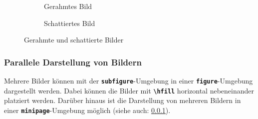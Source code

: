 \begin{figure}[H]
    \centering
    \begin{subfigure}{0.45\textwidth}
        \centering
        \caption{Gerahmtes Bild}
        \label{fig:gerahmtes_bild}
    \end{subfigure}
    \hfill
    \begin{subfigure}{0.45\textwidth}
        \centering
        \caption{Schattiertes Bild}
        \label{fig:schattiertes_bild}
    \end{subfigure}
    \caption{Gerahmte und schattierte Bilder}
    \label{fig:gerahmte_schattierte_bilder}
\end{figure}


\subsubsection{Parallele Darstellung von Bildern}
Mehrere Bilder können mit der \textbf{\texttt{subfigure}}-Umgebung in einer \textbf{\texttt{figure}}-Umgebung dargestellt werden. Dabei können die Bilder mit \textbf{\texttt{\textbackslash hfill}} horizontal nebeneinander platziert werden. Darüber hinaus ist die Darstellung von mehreren Bildern in einer \textbf{\texttt{minipage}}-Umgebung möglich (siehe auch: \ref{}).

